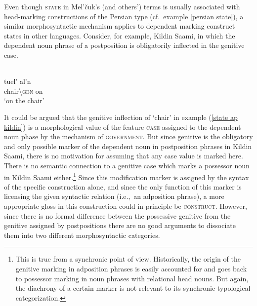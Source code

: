 Even though \textsc{state} in Mel'čuk's (and others') terms is usually associated with head-marking constructions of the Persian type (cf.~example \ref{persian state}), a similar morphosyntactic mechanism applies to dependent marking construct states in other languages. Consider, for example, Kildin Saami, in which the dependent noun phrase of a postposition is obligatorily inflected in the genitive case.
\begin{exe}
\ex\label{state ap kildin} 
\\
\gll 	tuel'		al'n\\
	chair\textbackslash\textsc{gen}	on\\
\glt 	‘on the chair’
\end{exe}
It could be argued that the genitive inflection of ‘chair’ in example (\ref{state ap kildin}) is a morphological value of the feature \textsc{case} assigned to the dependent noun phase by the mechanism of \textsc{government}. But since genitive is the obligatory and only possible marker of the dependent noun in postposition phrases in Kildin Saami, there is no motivation for assuming that any case value is marked here. There is no semantic connection to a genitive case which marks a possessor noun in Kildin Saami either.\footnote{This is true from a synchronic point of view. Historically, the origin of the genitive marking in adposition phrases is easily accounted for and goes back to possessor marking in noun phrases with relational head nouns. But again, the diachrony of a certain marker is not relevant to its synchronic-typological categorization.} Since this modification marker is assigned by the syntax of the specific construction alone, and since the only function of this marker is licensing the given syntactic relation (i.e.,~an adposition phrase), a more appropriate gloss in this construction could in principle be \textsc{construct}. However, since there is no formal difference between the possessive genitive from the genitive assigned by postpositions there are no good arguments to dissociate them into two different morphosyntactic categories.

